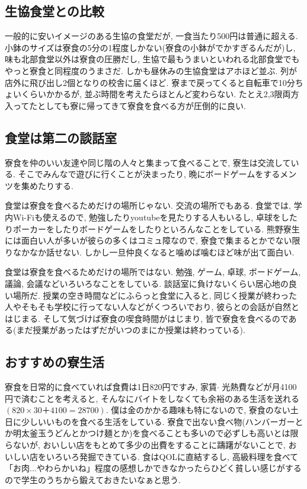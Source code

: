 \documentclass[10pt,b5jsbook,dvips,dvipdfmx,openany]{jsbook}
\theoremstyle{definition}
\begin{document}
		\subsection{生協食堂との比較}
		一般的に安いイメージのある生協の食堂だが, 一食当たり500円は普通に超える. 小鉢のサイズは寮食の5分の1程度しかない(寮食の小鉢がでかすぎるんだが)し, 味も北部食堂以外は寮食の圧勝だし, 生協で最もうまいといわれる北部食堂でもやっと寮食と同程度のうまさだ. しかも昼休みの生協食堂はアホほど並ぶ. 列が店外に飛び出し2個となりの校舎に届くほど. 寮まで戻ってくると自転車で10分ちょいくらいかかるが, 並ぶ時間を考えたらほとんど変わらない. たとえ2,3限両方入ってたとしても寮に帰ってきて寮食を食べる方が圧倒的に良い.

		\subsection{食堂は第二の談話室}
		寮食を仲のいい友達や同じ階の人々と集まって食べることで, 寮生は交流している. そこでみんなで遊びに行くことが決まったり, 晩にボードゲームをするメンツを集めたりする.

		食堂は寮食を食べるためだけの場所じゃない. 交流の場所でもある. 食堂では, 学内Wi-Fiも使えるので, 勉強したりyoutubeを見たりする人もいるし, 卓球をしたりポーカーをしたりボードゲームをしたりといろんなことをしている. 熊野寮生には面白い人が多いが彼らの多くはコミュ障なので, 寮食で集まるとかでない限りなかなか話せない. しかし一旦仲良くなると噛めば噛むほど味が出て面白い.

		食堂は寮食を食べるためだけの場所ではない. 勉強, ゲーム, 卓球, ボードゲーム, 議論, 会議などいろいろなことをしている. 談話室に負けないくらい居心地の良い場所だ. 授業の空き時間などにふらっと食堂に入ると, 同じく授業が終わった人やそもそも学校に行ってない人などがくつろいでおり, 彼らとの会話が自然とはじまる. そして気づけば寮食の喫食時間がはじまり, 皆で寮食を食べるのである(まだ授業があったはずだがいつのまにか授業は終わっている).

		\subsection{おすすめの寮生活}
		寮食を日常的に食べていれば食費は1日820円ですみ, 家賃$ \cdot $ 光熱費などが月4100円で済むことを考えると, そんなにバイトをしなくても余裕のある生活を送れる$(820×30＋4100=28700)$. 僕は金のかかる趣味も特にないので, 寮食のない土日に少しいいものを食べる生活をしている. 寮食で出ない食べ物(ハンバーガーとか明太釜玉うどんとかつけ麺とか)を食べることも多いので必ずしも高いとは限らないが, おいしい店をもとめて多少の出費をすることに躊躇がないことで, おいしい店をいろいろ発掘できている. 食はQOLに直結するし, 高級料理を食べて「お肉...やわらかいね」程度の感想しかできなかったらひどく貧しい感じがするので学生のうちから鍛えておきたいなぁと思う.
\end{document}
